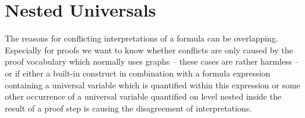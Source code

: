 % 


\section{Nested Universals}\label{nested} 
The reasons for conflicting interpretations of a formula 
can be overlapping. 
Especially for proofs we want to know whether conflicts are only 
caused by the proof vocabulary which normally uses graphs -- 
these cases are rather harmless -- or if either a built-in construct in combination with a formula expression containing a universal variable which is quantified within this expression
or some other occurrence of a universal variable quantified on level nested inside the result of a proof step is causing the disagreement of interpretations. 

